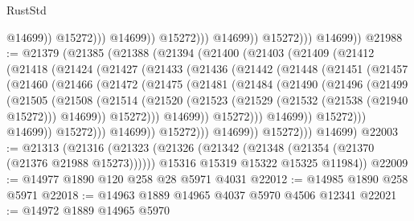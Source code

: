 \begin{lexlean}{RustStd}
\begin{coremodule}
                                      @14699))
                                  @15272)))
                            @14699))
                        @15272)))
                  @14699))
              @15272)))
        @14699))
@21988 := @21379
    (@21385
      (@21388
        (@21394
          (@21400
            (@21403
              (@21409
                (@21412
                  (@21418
                    (@21424
                      (@21427
                        (@21433
                          (@21436
                            (@21442
                              (@21448
                                (@21451
                                  (@21457
                                    (@21460
                                      (@21466
                                        (@21472
                                          (@21475
                                            (@21481
                                              (@21484
                                                (@21490
                                                  (@21496
                                                    (@21499
                                                      (@21505
                                                        (@21508
                                                          (@21514
                                                            (@21520
                                                              (@21523
                                                                (@21529
                                                                  (@21532 (@21538 (@21940 @15272)))
                                                                  @14699))
                                                              @15272)))
                                                        @14699))
                                                    @15272)))
                                              @14699))
                                          @15272)))
                                    @14699))
                                @15272)))
                          @14699))
                      @15272)))
                @14699))
            @15272)))
      @14699)
@22003 := @21313
    (@21316
      (@21323
        (@21326 (@21342 (@21348 (@21354 (@21370 (@21376 @21988 @15273))))))
        @15316
        @15319
        @15322
        @15325
        @11984))
@22009 := @14977 @1890 @120 @258 @28 @5971 @4031
@22012 := @14985 @1890 @258 @5971
@22018 := @14963 @1889 @14965 @4037 @5970 @4506 @12341
@22021 := @14972 @1889 @14965 @5970

\end{coremodule}
\end{lexlean}

